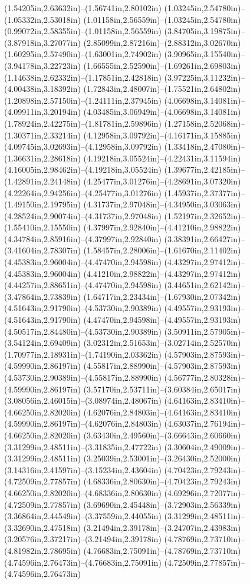 (1.54205in,2.63632in)--(1.56741in,2.80102in) (1.03245in,2.54780in)--(1.05332in,2.53018in) (1.01158in,2.56559in)--(1.03245in,2.54780in) (0.99072in,2.58355in)--(1.01158in,2.56559in) (3.84705in,3.19875in)--(3.87918in,3.27077in) (2.85099in,2.87216in)--(2.88312in,3.02670in) (1.60295in,2.57490in)--(1.63001in,2.74902in) (3.90965in,3.15540in)--(3.94178in,3.22723in) (1.66555in,2.52590in)--(1.69261in,2.69803in) (1.14638in,2.62332in)--(1.17851in,2.42818in) (3.97225in,3.11232in)--(4.00438in,3.18392in) (1.72843in,2.48007in)--(1.75521in,2.64802in) (1.20898in,2.57150in)--(1.24111in,2.37945in) (4.06698in,3.14081in)--(4.09911in,3.20194in) (4.03485in,3.06949in)--(4.06698in,3.14081in) (1.78924in,2.42275in)--(1.81781in,2.59896in) (1.27158in,2.52068in)--(1.30371in,2.33214in) (4.12958in,3.09792in)--(4.16171in,3.15885in) (4.09745in,3.02693in)--(4.12958in,3.09792in) (1.33418in,2.47080in)--(1.36631in,2.28618in) (4.19218in,3.05524in)--(4.22431in,3.11594in) (4.16005in,2.98462in)--(4.19218in,3.05524in) (1.39677in,2.42185in)--(1.42891in,2.24148in) (4.25477in,3.01276in)--(4.28691in,3.07320in) (4.22264in,2.94256in)--(4.25477in,3.01276in) (1.45937in,2.37377in)--(1.49150in,2.19795in) (4.31737in,2.97048in)--(4.34950in,3.03063in) (4.28524in,2.90074in)--(4.31737in,2.97048in) (1.52197in,2.32652in)--(1.55410in,2.15550in) (4.37997in,2.92840in)--(4.41210in,2.98822in) (4.34784in,2.85916in)--(4.37997in,2.92840in) (3.38391in,2.66427in)--(3.41604in,2.78307in) (1.58457in,2.28006in)--(1.61670in,2.11402in) (4.45383in,2.96004in)--(4.47470in,2.94598in) (4.43297in,2.97412in)--(4.45383in,2.96004in) (4.41210in,2.98822in)--(4.43297in,2.97412in) (4.44257in,2.88651in)--(4.47470in,2.94598in) (3.44651in,2.62142in)--(3.47864in,2.73839in) (1.64717in,2.23434in)--(1.67930in,2.07342in) (4.51643in,2.91790in)--(4.53730in,2.90389in) (4.49557in,2.93193in)--(4.51643in,2.91790in) (4.47470in,2.94598in)--(4.49557in,2.93193in) (4.50517in,2.84480in)--(4.53730in,2.90389in) (3.50911in,2.57905in)--(3.54124in,2.69409in) (3.02312in,2.51653in)--(3.02714in,2.52570in) (1.70977in,2.18931in)--(1.74190in,2.03362in) (4.57903in,2.87593in)--(4.59990in,2.86197in) (4.55817in,2.88990in)--(4.57903in,2.87593in) (4.53730in,2.90389in)--(4.55817in,2.88990in) (4.56777in,2.80328in)--(4.59990in,2.86197in) (3.57170in,2.53711in)--(3.60384in,2.65017in) (3.08056in,2.46015in)--(3.08974in,2.48067in) (4.64163in,2.83410in)--(4.66250in,2.82020in) (4.62076in,2.84803in)--(4.64163in,2.83410in) (4.59990in,2.86197in)--(4.62076in,2.84803in) (4.63037in,2.76194in)--(4.66250in,2.82020in) (3.63430in,2.49560in)--(3.66643in,2.60660in) (3.31299in,2.48511in)--(3.31835in,2.47722in) (3.30604in,2.49009in)--(3.31299in,2.48511in) (3.25039in,2.53001in)--(3.26430in,2.52000in) (3.14316in,2.41597in)--(3.15234in,2.43604in) (4.70423in,2.79243in)--(4.72509in,2.77857in) (4.68336in,2.80630in)--(4.70423in,2.79243in) (4.66250in,2.82020in)--(4.68336in,2.80630in) (4.69296in,2.72077in)--(4.72509in,2.77857in) (3.69690in,2.45448in)--(3.72903in,2.56339in) (3.36864in,2.44549in)--(3.37559in,2.44055in) (3.31299in,2.48511in)--(3.32690in,2.47518in) (3.21494in,2.39178in)--(3.24707in,2.43983in) (3.20576in,2.37217in)--(3.21494in,2.39178in) (4.78769in,2.73710in)--(4.81982in,2.78695in) (4.76683in,2.75091in)--(4.78769in,2.73710in) (4.74596in,2.76473in)--(4.76683in,2.75091in) (4.72509in,2.77857in)--(4.74596in,2.76473in) 